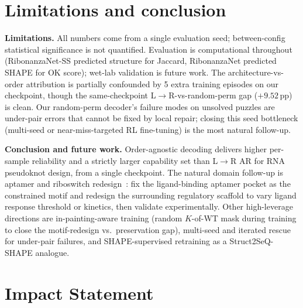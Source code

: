 \documentclass{article}
\begin{document}
\section{Limitations and conclusion}
\label{sec:concl}

\noindent\textbf{Limitations.} All numbers come from a single evaluation
seed; between-config statistical significance is not quantified.
Evaluation is computational throughout (RibonanzaNet-SS predicted
structure for Jaccard, RibonanzaNet predicted SHAPE for OK score);
wet-lab validation is future work. The architecture-vs-order
attribution is partially confounded by 5 extra training episodes on
our checkpoint, though the same-checkpoint L$\to$R-vs-random-perm
gap ($+9.52$\,pp) is clean. Our random-perm decoder's failure modes
on unsolved puzzles are under-pair errors that cannot be fixed by
local repair; closing this seed bottleneck (multi-seed or
near-miss-targeted RL fine-tuning) is the most natural follow-up.

\noindent\textbf{Conclusion and future work.} Order-agnostic decoding
delivers higher per-sample reliability and a strictly larger
capability set than L$\to$R AR for RNA pseudoknot design, from a
single checkpoint. The natural domain follow-up is aptamer and
riboswitch redesign~\citep{wachsmuth2013riboswitch,
penchovsky2014review,waymentsteele2022switches}: fix the
ligand-binding aptamer pocket as the constrained motif and redesign
the surrounding regulatory scaffold to vary ligand response
threshold or kinetics, then validate experimentally. Other
high-leverage directions are in-painting-aware training (random
$K$-of-WT mask during training to close the motif-redesign vs.\
preservation gap), multi-seed and iterated rescue for under-pair
failures, and SHAPE-supervised retraining as a Struct2SeQ-SHAPE
analogue.

\section*{Impact Statement}
\end{document}

